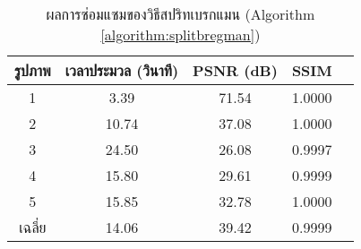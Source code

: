 \begin{table}[H]
	\centering
	\begin{tabular}[ht]{|c|c|c|c|c|}
		\hline
		รูปภาพ &เวลาประมวล  (วินาที) & PSNR (dB) & SSIM \\
		\hline
		1 & 3.39 & 71.54 & 1.0000 \\ 
		2 & 10.74 & 37.08 & 1.0000 \\
		3 &  24.50 & 26.08 & 0.9997 \\
		4 & 15.80  & 29.61  & 0.9999 \\
		5 & 15.85  & 32.78  & 1.0000 \\
		\hline
		เฉลี่ย & 14.06  & 39.42  & 0.9999 \\
		\hline
	\end{tabular}
	\caption{ผลการซ่อมแซมของวิธีสปริทเบรกแมน (Algorithm \ref{algorithm:splitbregman})}
	\label{table:result-splitbregman}
\end{table}